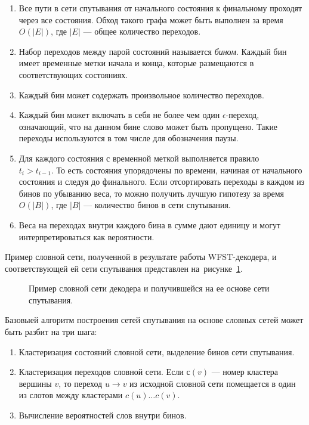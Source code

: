 \begin{enumerate}
  \item Все пути в сети спутывания от начального состояния к финальному проходят через все состояния. Обход такого графа может быть выполнен за время $O(|E|)$, где $|E|$ --- общее количество переходов.
  \item Набор переходов между парой состояний называется \textit{бином}. Каждый бин имеет временные метки начала и конца, которые размещаются в соответствующих состояниях.
  \item Каждый бин может содержать произвольное количество переходов.
  \item Каждый бин может включать в себя не более чем один $\epsilon$-переход, означающий, что на данном бине слово может быть пропущено. Такие переходы используются в том числе для обозначения паузы.
  \item Для каждого состояния с временной меткой выполняется правило \\ $t_{i} > t_{i-1}$. То есть состояния упорядочены по времени, начиная от начального состояния и следуя до финального. Если отсортировать переходы в каждом из бинов по убыванию веса, то можно получить лучшую гипотезу за время $O(|B|)$, где $|B|$ --- количество бинов в сети спутывания.
  \item Веса на переходах внутри каждого бина в сумме дают единицу и могут интерпретироваться как вероятности.
\end{enumerate}

Пример словной сети, полученной в результате работы WFST-декодера, и соответствующей ей сети спутывания представлен на~рисунке~\cref{fig:confnet}.

\begin{figure}[ht]
  \caption{Пример словной сети декодера и получившейся на ее основе сети спутывания.}\label{fig:confnet}
\end{figure}

Базовыей алгоритм построения сетей спутывания на основе словных сетей может быть разбит на три шага:
\begin{enumerate}
  \item Кластеризация состояний словной сети, выделение бинов сети спутывания.
  \item Кластеризация переходов словной сети. Если $с(v)$ --- номер кластера вершины $v$, то переход $u \rightarrow v$ из исходной словной сети помещается в один из слотов между кластерами $c(u) \ldots c(v)$.
  \item Вычисление вероятностей слов внутри бинов.
\end{enumerate}

